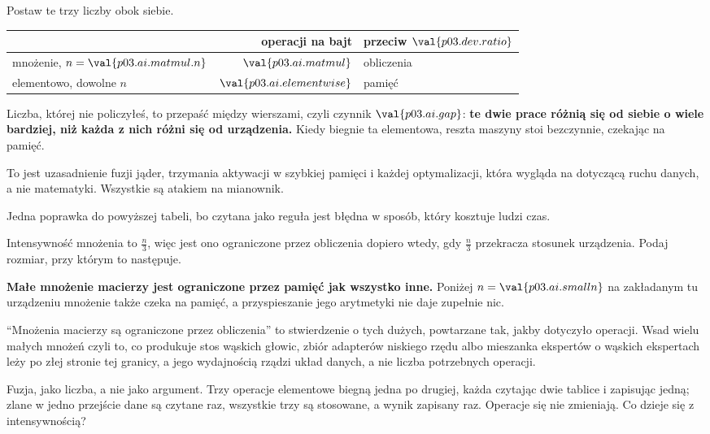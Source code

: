 \begin{fr}

Postaw te trzy liczby obok siebie.

\begin{center}
\begin{tabular}{lrl}
\toprule
 & operacji na bajt & przeciw $\val{p03.dev.ratio}$ \\
\midrule
mnożenie, $n = \val{p03.ai.matmul.n}$ & $\val{p03.ai.matmul}$ & obliczenia \\
elementowo, dowolne $n$ & $\val{p03.ai.elementwise}$ & pamięć \\
\bottomrule
\end{tabular}
\end{center}

Liczba, której nie policzyłeś, to przepaść między wierszami, czyli czynnik
$\val{p03.ai.gap}$: \textbf{te dwie prace różnią się od siebie o wiele
bardziej, niż każda z nich różni się od urządzenia.} Kiedy biegnie ta
elementowa, reszta maszyny stoi bezczynnie, czekając na pamięć.

To jest uzasadnienie fuzji jąder, trzymania aktywacji w szybkiej pamięci i
każdej optymalizacji, która wygląda na dotyczącą ruchu danych, a nie
matematyki. Wszystkie są atakiem na mianownik.
\end{fr}

\begin{fr}
Jedna poprawka do powyższej tabeli, bo czytana jako reguła jest błędna w
sposób, który kosztuje ludzi czas.

Intensywność mnożenia to $\frac{n}{3}$, więc jest ono ograniczone przez
obliczenia dopiero wtedy, gdy $\frac{n}{3}$ przekracza stosunek urządzenia.
Podaj rozmiar, przy którym to następuje.
\nextframe
\end{fr}

\begin{fr}
\begin{warning}
\textbf{Małe mnożenie macierzy jest ograniczone przez pamięć jak wszystko
inne.} Poniżej $n = \val{p03.ai.smalln}$ na zakładanym tu urządzeniu mnożenie
także czeka na pamięć, a przyspieszanie jego arytmetyki nie daje zupełnie nic.

\enquote{Mnożenia macierzy są ograniczone przez obliczenia} to stwierdzenie o
tych dużych, powtarzane tak, jakby dotyczyło operacji. Wsad wielu małych
mnożeń \dash{} czyli to, co produkuje stos wąskich głowic, zbiór adapterów
niskiego rzędu albo mieszanka ekspertów o wąskich ekspertach \dash{} leży po
złej stronie tej granicy, a jego wydajnością rządzi układ danych, a nie liczba
potrzebnych operacji.
\end{warning}

Fuzja, jako liczba, a nie jako argument. Trzy operacje elementowe biegną jedna
po drugiej, każda czytając dwie tablice i zapisując jedną; zlane w jedno
przejście dane są czytane raz, wszystkie trzy są stosowane, a wynik zapisany
raz. Operacje się nie zmieniają. Co dzieje się z intensywnością?
\dotline
\nextframe
\end{fr}

